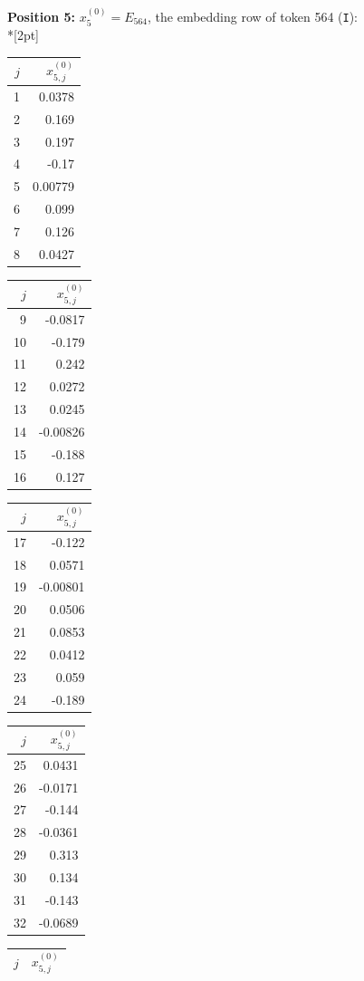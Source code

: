 \noindent \textbf{Position 5:} $x^{(0)}_{5} = E_{564}$, the embedding row of token 564 (\texttt{I}):\\*[2pt]
{\tablefont \begin{tabular}[t]{r|r}
$j$ & $x^{(0)}_{5,j}$ \\\hline
1 & 0.0378 \\
2 & 0.169 \\
3 & 0.197 \\
4 & -0.17 \\
5 & 0.00779 \\
6 & 0.099 \\
7 & 0.126 \\
8 & 0.0427
\end{tabular}\kern4pt
\begin{tabular}[t]{r|r}
$j$ & $x^{(0)}_{5,j}$ \\\hline
9 & -0.0817 \\
10 & -0.179 \\
11 & 0.242 \\
12 & 0.0272 \\
13 & 0.0245 \\
14 & -0.00826 \\
15 & -0.188 \\
16 & 0.127
\end{tabular}\kern4pt
\begin{tabular}[t]{r|r}
$j$ & $x^{(0)}_{5,j}$ \\\hline
17 & -0.122 \\
18 & 0.0571 \\
19 & -0.00801 \\
20 & 0.0506 \\
21 & 0.0853 \\
22 & 0.0412 \\
23 & 0.059 \\
24 & -0.189
\end{tabular}\kern4pt
\begin{tabular}[t]{r|r}
$j$ & $x^{(0)}_{5,j}$ \\\hline
25 & 0.0431 \\
26 & -0.0171 \\
27 & -0.144 \\
28 & -0.0361 \\
29 & 0.313 \\
30 & 0.134 \\
31 & -0.143 \\
32 & -0.0689
\end{tabular}\kern4pt
\begin{tabular}[t]{r|r}
$j$ & $x^{(0)}_{5,j}$ \\\hline

\end{tabular}}
